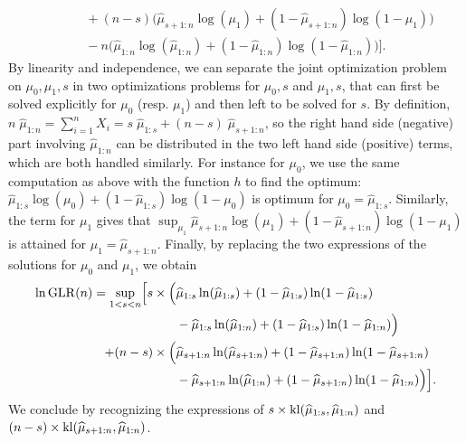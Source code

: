 \begin{smallproof}
\begin{align*}
            & \hspace{35pt} + (n-s) \bigl( \widehat{\mu}_{s+1:n} \log(\mu_1) + (1 - \widehat{\mu}_{s+1:n}) \log(1-\mu_1) \bigr) \\
            & \hspace{35pt} - n \bigl( \widehat{\mu}_{1:n} \log(\widehat{\mu}_{1:n}) + (1 - \widehat{\mu}_{1:n}) \log(1-\widehat{\mu}_{1:n}) \bigr)
        \Bigr].
    \end{align*}
    By linearity and independence, we can separate the joint optimization problem on $\mu_0,\mu_1,s$ in two optimizations problems for $\mu_0,s$ and $\mu_1,s$, that can first be solved explicitly for $\mu_0$ (resp. $\mu_1$) and then left to be solved for $s$.
    By definition, $n \; \widehat{\mu}_{1:n} = \sum_{i=1}^n X_i = s \;\widehat{\mu}_{1:s} + (n-s) \;\widehat{\mu}_{s+1:n}$, so the right hand side (negative) part involving $\widehat{\mu}_{1:n}$ can be distributed in the two left hand side (positive) terms,
    which are both handled similarly.
    For instance for $\mu_0$, we use the same computation as above with the function $h$ to find the optimum:
    $\widehat{\mu}_{1:s} \log(\mu_0) + (1 - \widehat{\mu}_{1:s}) \log(1-\mu_0)$
    is optimum for $\mu_0 = \widehat{\mu}_{1:s}$.
    Similarly, the term for $\mu_1$ gives that $\sup_{\mu_1} \widehat{\mu}_{s+1:n} \log(\mu_1) + (1 - \widehat{\mu}_{s+1:n}) \log(1-\mu_1)$
    is attained for $\mu_1 = \widehat{\mu}_{s+1:n}$.
    Finally, by replacing the two expressions of the solutions for $\mu_0$ and $\mu_1$,
    we obtain
    \begin{align*}
        \ln \mathrm{GLR}(n)
        = \sup\limits_{1 < s < n} \Bigl[
            s \times \Bigl(
                    & \widehat{\mu}_{1:s} \ln(\widehat{\mu}_{1:s}) + (1 - \widehat{\mu}_{1:s}) \ln(1-\widehat{\mu}_{1:s}) \\
                    & - \widehat{\mu}_{1:s} \ln(\widehat{\mu}_{1:n}) + (1 - \widehat{\mu}_{1:s}) \ln(1-\widehat{\mu}_{1:n})
            \Bigr) \\
            + (n-s) \times \Bigl(
                & \widehat{\mu}_{s+1:n} \ln(\widehat{\mu}_{s+1:n}) + (1 - \widehat{\mu}_{s+1:n}) \ln(1-\widehat{\mu}_{s+1:n}) \\
                & - \widehat{\mu}_{s+1:n} \ln(\widehat{\mu}_{1:n}) + (1 - \widehat{\mu}_{s+1:n}) \ln(1-\widehat{\mu}_{1:n})
            \Bigr)
        \Bigr].
    \end{align*}
    We conclude by recognizing the expressions of $s \times \mathrm{kl}(\widehat{\mu}_{1:s}, \widehat{\mu}_{1:n})$
    and $(n-s) \times \mathrm{kl}(\widehat{\mu}_{s+1:n}, \widehat{\mu}_{1:n})$.
\end{smallproof}


